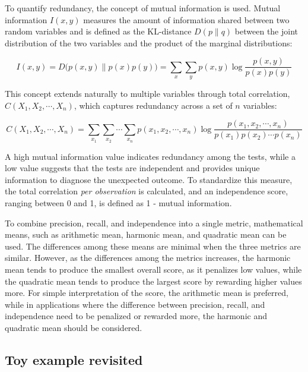 \documentclass[
  12pt,
]{interact}
\begin{document}
To quantify redundancy, the concept of mutual information is used.
Mutual information \(I(x, y)\) measures the amount of information shared
between two random variables and is defined as the KL-distance
\(D(p \parallel q)\) between the joint distribution of the two variables
and the product of the marginal distributions:

\[I(x,y) = D\big(p(x,y) \parallel p(x)p(y)\big) = \sum_x \sum_y p(x,y) \log \frac{p(x,y)}{p(x)p(y)}\]

This concept extends naturally to multiple variables through total
correlation, \(C(X_1, X_2, \cdots, X_n)\), which captures redundancy
across a set of \(n\) variables:

\[C(X_1, X_2, \cdots, X_n) = \sum_{x_1} \sum_{x_2} \cdots \sum_{x_n} p(x_1, x_2, \cdots, x_n) \log \frac{p(x_1, x_2, \cdots, x_n)}{p(x_1)p(x_2) \cdots p(x_n)}\]

A high mutual information value indicates redundancy among the tests,
while a low value suggests that the tests are independent and provides
unique information to diagnose the unexpected outcome. To standardize
this measure, the total correlation \emph{per observation} is
calculated, and an independence score, ranging between 0 and 1, is
defined as 1 - mutual information.

To combine precision, recall, and independence into a single metric,
mathematical means, such as arithmetic mean, harmonic mean, and
quadratic mean can be used. The differences among these means are
minimal when the three metrics are similar. However, as the differences
among the metrics increases, the harmonic mean tends to produce the
smallest overall score, as it penalizes low values, while the quadratic
mean tends to produce the largest score by rewarding higher values more.
For simple interpretation of the score, the arithmetic mean is
preferred, while in applications where the difference between precision,
recall, and independence need to be penalized or rewarded more, the
harmonic and quadratic mean should be considered.

\subsection{Toy example revisited}\label{toy-example-revisited}
\end{document}

